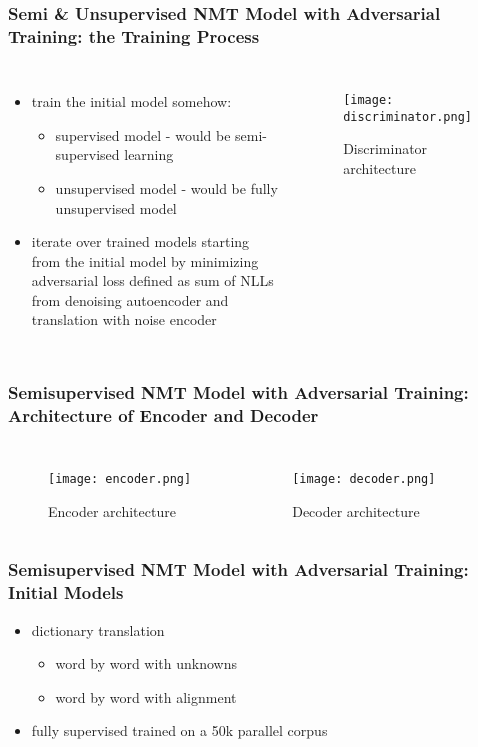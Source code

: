 \documentclass{beamer}
\begin{document}
\begin{frame}
\frametitle{Semi \& Unsupervised NMT Model with Adversarial Training: the Training Process}

\begin{columns}
\begin{itemize}
\item train the initial model somehow:
\begin{itemize}
\item supervised model - would be semi-supervised learning
\item unsupervised model - would be fully unsupervised model
\end{itemize}
\item iterate over trained models starting from the initial model by minimizing adversarial loss defined as sum of NLLs from denoising autoencoder and translation with noise encoder
\end{itemize}
\centering
{}
\begin{figure}
\texttt{[image: discriminator.png]}
\caption{Discriminator architecture}
\end{figure}
\end{columns}

\end{frame}

\begin{frame}
\frametitle{Semisupervised NMT Model with Adversarial Training: Architecture of Encoder and Decoder}

\begin{columns}
\centering
\begin{figure}
\texttt{[image: encoder.png]}
\caption{Encoder architecture}
\end{figure}
\begin{figure}
\texttt{[image: decoder.png]}
\caption{Decoder architecture}
\end{figure}
\end{columns}
\end{frame}

\begin{frame}
\frametitle{Semisupervised NMT Model with Adversarial Training: Initial Models}

\begin{itemize}
\item dictionary translation
\begin{itemize}
\item word by word with unknowns
\item word by word with alignment
\end{itemize}
\item fully supervised trained on a 50k parallel corpus
\end{itemize}

\end{frame}
\end{document}
